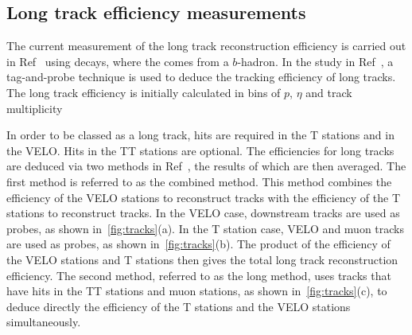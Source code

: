 
\subsection{Long track efficiency measurements}
\label{sec:long}
The current measurement of the long track reconstruction efficiency is carried out in Ref~\cite{LHCB-DP-2013-002} using \jpsi \to \mumu decays, where the \jpsi comes from a $b$-hadron. In the study in Ref~\cite{LHCB-DP-2013-002}, a tag-and-probe technique is used to deduce the tracking efficiency of long tracks. The long track efficiency is initially calculated in bins of $p$, $\eta$ and track multiplicity %





In order to be classed as a long track, hits are required in the T stations and in the VELO. Hits in the TT stations are optional. The efficiencies for long tracks are deduced via two methods in Ref~\cite{LHCB-DP-2013-002}, the results of which are then averaged. The first method is referred to as the combined method. This method combines the efficiency of the VELO stations to reconstruct tracks with the efficiency of the T stations to reconstruct tracks. In the VELO case, downstream tracks are used as probes, as shown in~\autoref{fig:tracks}(a). In the T station case, VELO and muon tracks are used as probes, as shown in~\autoref{fig:tracks}(b). The  product of the efficiency of the VELO stations and T stations then gives the total long track reconstruction efficiency. The second method, referred to as the long method, uses tracks that have hits in the TT stations and muon stations, as shown in~\autoref{fig:tracks}(c), to  deduce directly the efficiency of the T stations and the VELO stations simultaneously.

